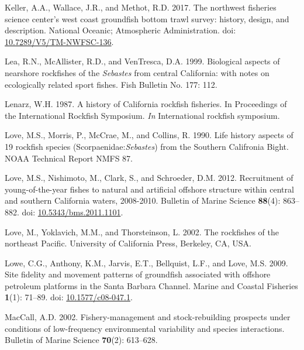 \documentclass[11pt,
  english,
]{article}
\newlength{\cslhangindent}
\newenvironment{CSLReferences}[2] %
 {%
  \setlength{\parindent}{0pt}
  \ifodd #1 \everypar{\setlength{\hangindent}{\cslhangindent}}\ignorespaces\fi
  \ifnum #2 > 0
  \setlength{\parskip}{#2\baselineskip}
  \fi
 }%
 {}
\begin{document}
\begin{CSLReferences}{1}{0}
\leavevmode{}%
Keller, A.A., Wallace, J.R., and Methot, R.D. 2017. {The northwest fisheries science center's west coast groundfish bottom trawl survey: history, design, and description}. National Oceanic; Atmospheric Administration. doi: \href{https://doi.org/10.7289/V5/TM-NWFSC-136}{10.7289/V5/TM-NWFSC-136}.

\leavevmode{}%
Lea, R.N., McAllister, R.D., and VenTresca, D.A. 1999. {Biological aspects of nearshore rockfishes of the \emph{Sebastes} from central California: with notes on ecologically related sport fishes.} Fish Bulletin No. 177: 112.

\leavevmode{}%
Lenarz, W.H. 1987. {A history of California rockfish fisheries. In Proceedings of the International Rockfish Symposium.} \emph{In} International rockfish symposium.

\leavevmode{}%
Love, M.S., Morris, P., McCrae, M., and Collins, R. 1990. {Life history aspects of 19 rockfish species (Scorpaenidae:\emph{Sebastes}) from the Southern Califronia Bight}. NOAA Technical Report NMFS 87.

\leavevmode{}%
Love, M.S., Nishimoto, M., Clark, S., and Schroeder, D.M. 2012. {Recruitment of young-of-the-year fishes to natural and artificial offshore structure within central and southern California waters, 2008-2010}. Bulletin of Marine Science \textbf{88}(4): 863--882. doi: \href{https://doi.org/10.5343/bms.2011.1101}{10.5343/bms.2011.1101}.

\leavevmode{}%
Love, M., Yoklavich, M.M., and Thorsteinson, L. 2002. {The rockfishes of the northeast Pacific}. University of California Press, Berkeley, CA, USA.

\leavevmode{}%
Lowe, C.G., Anthony, K.M., Jarvis, E.T., Bellquist, L.F., and Love, M.S. 2009. {Site fidelity and movement patterns of groundfish associated with offshore petroleum platforms in the Santa Barbara Channel}. Marine and Coastal Fisheries \textbf{1}(1): 71--89. doi: \href{https://doi.org/10.1577/c08-047.1}{10.1577/c08-047.1}.

\leavevmode{}%
MacCall, A.D. 2002. {Fishery-management and stock-rebuilding prospects under conditions of low-frequency environmental variability and species interactions}. Bulletin of Marine Science \textbf{70}(2): 613--628.


\end{CSLReferences}
\end{document}
